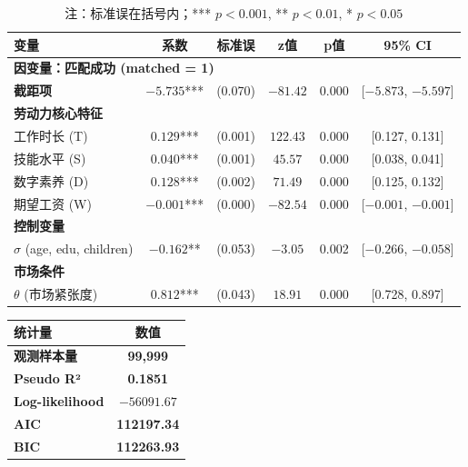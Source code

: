 \documentclass[12pt, a4paper]{article}
\begin{document}
\begin{table}[htbp]
\centering
\small
\begin{tabular}{lccccc}
\toprule
\textbf{变量} & \textbf{系数} & \textbf{标准误} & \textbf{z值} & \textbf{p值} & \textbf{95\% CI} \\
\midrule
\multicolumn{6}{l}{\textbf{因变量：匹配成功 (matched = 1)}} \\
\midrule
\textbf{截距项} & $-5.735$*** & (0.070) & $-81.42$ & 0.000 & [$-5.873$, $-5.597$] \\
\midrule
\multicolumn{6}{l}{\textbf{劳动力核心特征}} \\
\quad 工作时长 (T) & $0.129$*** & (0.001) & $122.43$ & 0.000 & [0.127, 0.131] \\
\quad 技能水平 (S) & $0.040$*** & (0.001) & $45.57$ & 0.000 & [0.038, 0.041] \\
\quad 数字素养 (D) & $0.128$*** & (0.002) & $71.49$ & 0.000 & [0.125, 0.132] \\
\quad 期望工资 (W) & $-0.001$*** & (0.000) & $-82.54$ & 0.000 & [$-0.001$, $-0.001$] \\
\midrule
\multicolumn{6}{l}{\textbf{控制变量}} \\
\quad $\sigma$ (age, edu, children) & $-0.162$** & (0.053) & $-3.05$ & 0.002 & [$-0.266$, $-0.058$] \\
\midrule
\multicolumn{6}{l}{\textbf{市场条件}} \\
\quad $\theta$ (市场紧张度) & $0.812$*** & (0.043) & $18.91$ & 0.000 & [0.728, 0.897] \\
\bottomrule
\end{tabular}
\caption*{注：标准误在括号内；*** $p<0.001$, ** $p<0.01$, * $p<0.05$}
\end{table}

\vspace{0.5cm}

\begin{table}[htbp]
\centering
\begin{tabular}{lc}
\toprule
\textbf{统计量} & \textbf{数值} \\
\midrule
\textbf{观测样本量} & \textbf{99,999} \\
\textbf{Pseudo R²} & \textbf{0.1851} \\
\textbf{Log-likelihood} & \textbf{$-56091.67$} \\
\textbf{AIC} & \textbf{112197.34} \\
\textbf{BIC} & \textbf{112263.93} \\
\bottomrule
\end{tabular}
\end{table}
\end{document}
